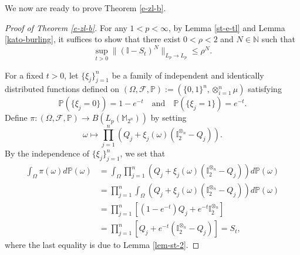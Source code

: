 \documentclass{amsbook}
\theoremstyle{definition}
\theoremstyle{remark}
\numberwithin{section}{chapter}
\numberwithin{equation}{chapter}
\newcommand{\1}{\mathbf{1}}
\begin{document}
We now are ready to prove Theorem \ref{e-zl-b}.
\begin{proof}[Proof of Theorem \ref{e-zl-b}]
For any $1<p<\infty$, by Lemma \ref{st-e-tl} and Lemma \ref{kato-burling}, it suffices to show that there exist $0<\rho<2$ and $N\in\mathbb{N}$ such that
\begin{equation}\label{st-rho}
\sup_{t>0}\|(\mathbb{I}-S_t)^{N}\|_{L_{p}\rightarrow L_{p}}\leq \rho^N.
\end{equation}

For a fixed $t>0$, let $\{\xi_j\}_{j=1}^n$ be a family of independent and identically distributed functions defined on $(\Omega,\mathcal{F},\mathbb{P}):=(\{0,1\}^n,\otimes_{i=1}^n\mu)$ satisfying
\[
\mathbb{P}(\{\xi_j=0\})=1-e^{-t}\quad\mbox{and}\quad \mathbb{P}(\{\xi_j=1\})=e^{-t}.
\]
Define $\pi:(\Omega,\mathcal{F},\mathbb{P})\rightarrow B(L_p(\mathbb{M}_{2^n}))$ by setting
\begin{equation}\label{pi-def}
\omega\mapsto\prod_{j=1}^n(Q_j+\xi_j(\omega)(\mathbb{I}_2^{\otimes_n}-Q_j)).
\end{equation}
By the independence of $\{\xi_j\}_{j=1}^n$, we set that 
\begin{align}\label{st-new}
\int_\Omega\pi(\omega)d\mathbb{P}(\omega)&=\int_\Omega\prod_{j=1}^n(Q_j+\xi_j(\omega)(\mathbb{I}_2^{\otimes_n}-Q_j))d\mathbb{P}(\omega)\nonumber\\
&=\prod_{j=1}^n\int_\Omega(Q_j+\xi_j(\omega)(\mathbb{I}_2^{\otimes_n}-Q_j))d\mathbb{P}(\omega)\nonumber\\
&=\prod_{j=1}^n[(1-e^{-t})Q_j+e^{-t}\mathbb{I}_2^{\otimes_n}]\\
&=\prod_{j=1}^n[Q_j+e^{-t}(\mathbb{I}_2^{\otimes_n}-Q_j)]\nonumber=S_t\nonumber,
\end{align}
where the last equality is due to Lemma \ref{lem-st-2}.



\end{proof}
\end{document}

